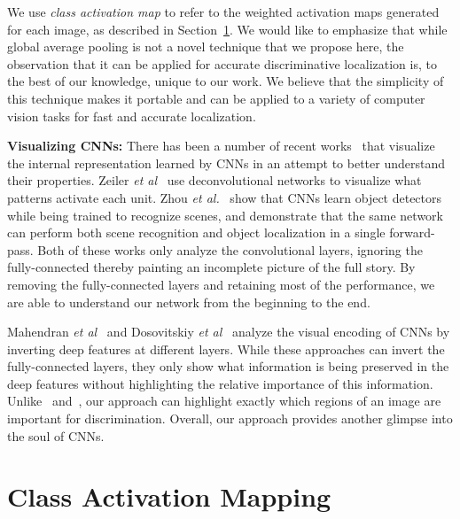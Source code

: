 \documentclass[10pt,twocolumn,letterpaper]{article}
\begin{document}
We use \textit{class activation map} to refer to the weighted activation maps generated for each image, as described in Section~\ref{sec:cam}. We would like to emphasize that while global average pooling is not a novel technique that we propose here, the observation that it can be applied for accurate discriminative localization is, to the best of our knowledge, unique to our work. We believe that the simplicity of this technique makes it portable and can be applied to a variety of computer vision tasks for fast and accurate localization.

\textbf{Visualizing CNNs:} There has been a number of recent works~\cite{zeiler2014visualizing,mahendran2004understanding,dosovitskiy2015inverting,zhou2014object} that visualize the internal representation learned by CNNs in an attempt to better understand their properties. Zeiler \textit{et al}~\cite{zeiler2014visualizing} use deconvolutional networks to visualize what patterns activate each unit. Zhou \textit{et al.}~\cite{zhou2014object} show that CNNs learn object detectors while being trained to recognize scenes, and demonstrate that the same network can perform both scene recognition and object localization in a single forward-pass. Both of these works only analyze the convolutional layers, ignoring the fully-connected thereby painting an incomplete picture of the full story. By removing the fully-connected layers and retaining most of the performance, we are able to understand our network from the beginning to the end. 

Mahendran \textit{et al}~\cite{mahendran2004understanding} and Dosovitskiy \textit{et al}~\cite{dosovitskiy2015inverting} analyze the visual encoding of CNNs by inverting deep features at different layers. While these approaches can invert the fully-connected layers, they only show what information is being preserved in the deep features without highlighting the relative importance of this information. Unlike~\cite{mahendran2004understanding} and~\cite{dosovitskiy2015inverting}, our approach  can highlight exactly which regions of an image are important for discrimination. Overall, our approach provides another glimpse into the soul of CNNs.








\section{Class Activation Mapping}
\label{sec:cam}
\end{document}
